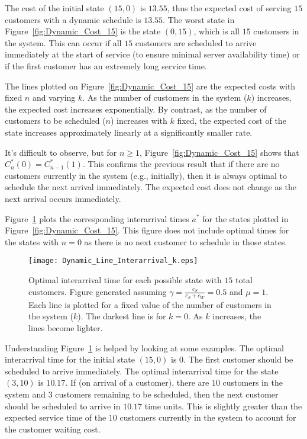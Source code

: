 The cost of the initial state $(15, 0)$ is $13.55$, thus the expected cost of serving $15$ customers with a dynamic schedule is $13.55$. The worst state in Figure~\ref{fig:Dynamic_Cost_15} is the state $(0, 15)$, which is all $15$ customers in the system. This can occur if all $15$ customers are scheduled to arrive immediately at the start of service (to ensure minimal server availability time) or if the first customer has an extremely long service time.

The lines plotted on Figure~\ref{fig:Dynamic_Cost_15} are the expected costs with fixed $n$ and varying $k$. As the number of customers in the system ($k$) increases, the expected cost increases exponentially. By contrast, as the number of customers to be scheduled ($n$) increases with $k$ fixed, the expected cost of the state increases approximately linearly at a significantly smaller rate.

It's difficult to observe, but for $n \geq 1$, Figure~\ref{fig:Dynamic_Cost_15} shows that $C_{n}^{*} (0) = C_{n - 1}^{*} (1)$. This confirms the previous result that if there are no customers currently in the system (e.g., initially), then it is always optimal to schedule the next arrival immediately. The expected cost does not change as the next arrival occurs immediately.

Figure~\ref{fig:Dynamic_Time_15} plots the corresponding interarrival times $a^{*}$ for the states plotted in Figure~\ref{fig:Dynamic_Cost_15}. This figure does not include optimal times for the states with $n = 0$ as there is no next customer to schedule in those states.
\begin{figure}[htb]
	\centering
	\texttt{[image: Dynamic\_Line\_Interarrival\_k.eps]}
	\caption{Optimal interarrival time for each possible state with $15$ total customers. Figure generated assuming $\gamma = \frac{c_{S}}{c_{S} + c_{W}} = 0.5$ and $\mu = 1$. Each line is plotted for a fixed value of the number of customers in the system ($k$). The darkest line is for $k = 0$. As $k$ increases, the lines become lighter.}
	\label{fig:Dynamic_Time_15}
\end{figure}

Understanding Figure~\ref{fig:Dynamic_Time_15} is helped by looking at some examples. The optimal interarrival time for the initial state $(15, 0)$ is $0$. The first customer should be scheduled to arrive immediately. The optimal interarrival time for the state $(3, 10)$ is $10.17$. If (on arrival of a customer), there are $10$ customers in the system and $3$ customers remaining to be scheduled, then the next customer should be scheduled to arrive in $10.17$ time units. This is slightly greater than the expected service time of the $10$ customers currently in the system to account for the customer waiting cost.

